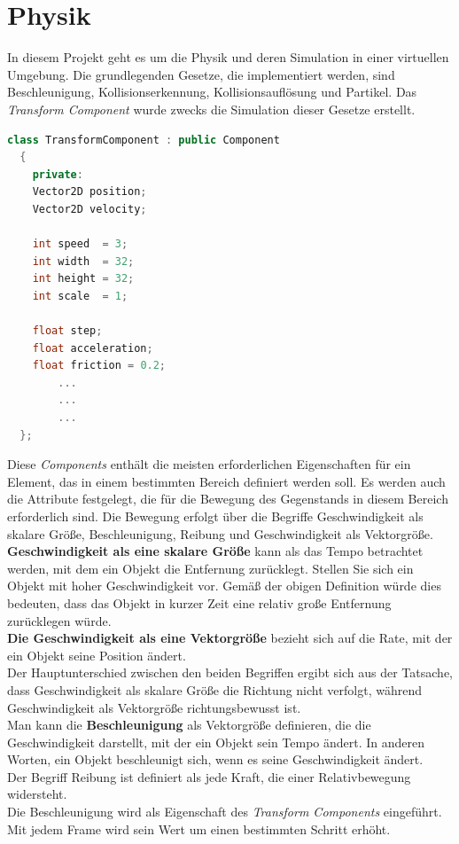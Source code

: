 \documentclass[
  10pt,
  a4paper,
  oneside,
  headers,
  headinclude,
  footinclude,
  BCOR5mm,
]{article}
\begin{document}
\section{Physik}
In diesem Projekt geht es um die Physik und deren Simulation in einer virtuellen
Umgebung. Die grundlegenden Gesetze, die implementiert werden, sind
Beschleunigung, Kollisionserkennung, Kollisionsauflösung und Partikel. Das
\textit{Transform Component} wurde zwecks die Simulation dieser Gesetze erstellt.

\begin{lstlisting}[language=C++]
  class TransformComponent : public Component
  {
    private:
    Vector2D position;
    Vector2D velocity;

    int speed  = 3;
    int width  = 32;
    int height = 32;
    int scale  = 1;

    float step;
    float acceleration;
    float friction = 0.2;
        ...
        ...
        ...
  };
\end{lstlisting}

Diese \textit{Components} enthält die meisten erforderlichen Eigenschaften für
ein Element, das in einem bestimmten Bereich definiert werden soll. Es werden
auch die Attribute festgelegt, die für die Bewegung des Gegenstands in diesem
Bereich erforderlich sind.
Die Bewegung erfolgt über die Begriffe Geschwindigkeit als skalare Größe,
Beschleunigung, Reibung und Geschwindigkeit als Vektorgröße. \\
\textbf{Geschwindigkeit als eine skalare Größe} kann als das Tempo betrachtet
werden, mit dem ein Objekt die Entfernung zurücklegt. Stellen Sie sich ein
Objekt mit hoher Geschwindigkeit vor. Gemäß der obigen Definition würde dies
bedeuten, dass das Objekt in kurzer Zeit eine relativ große Entfernung
zurücklegen würde. \\
\textbf{Die Geschwindigkeit als eine Vektorgröße} bezieht sich auf die Rate, mit
der ein Objekt seine Position ändert.\\
Der Hauptunterschied zwischen den beiden Begriffen ergibt sich aus der Tatsache,
dass Geschwindigkeit als skalare Größe die Richtung nicht verfolgt, während
Geschwindigkeit als Vektorgröße richtungsbewusst ist. \\
Man kann die \textbf{Beschleunigung} als Vektorgröße definieren, die die
Geschwindigkeit darstellt, mit der ein Objekt sein Tempo ändert. In anderen
Worten, ein Objekt beschleunigt sich, wenn es seine Geschwindigkeit ändert.\\
Der Begriff Reibung ist definiert als jede Kraft, die einer Relativbewegung
widersteht. \\
Die Beschleunigung wird als Eigenschaft des \textit{Transform Components}
eingeführt.
Mit jedem Frame wird sein Wert um einen bestimmten Schritt erhöht.
\end{document}
